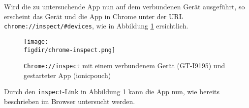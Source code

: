 Wird die zu untersuchende App nun auf dem verbundenen Gerät ausgeführt, so erscheint das Gerät und die App in Chrome unter der URL \texttt{chrome://inspect/\#devices}, wie in Abbildung \ref{fig:inspect} ersichtlich.

\begin{figure}[htb]
	\centering
	\caption{\texttt{Chrome://inspect} mit einem verbundenem Gerät (GT-I9195) und gestarteter App (ionicpouch)}
	\label{fig:inspect}
	\texttt{[image: \\figdir/chrome-inspect.png]}
\end{figure}

Durch den \texttt{inspect}-Link in Abbildung \ref{fig:inspect} kann die App nun, wie bereits beschrieben im Browser untersucht werden.

